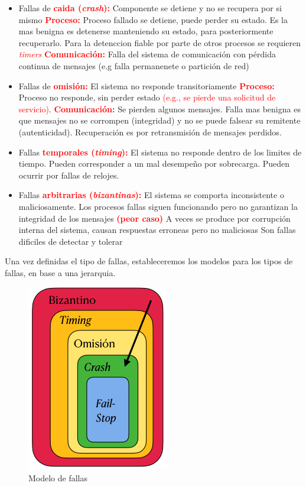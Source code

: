 \begin{itemize}
    \item Fallas de \textcolor{red}{\textbf{caida (\textit{crash}):}} Componente se detiene y no se recupera por si mismo
    \subitem \textcolor{red}{\textbf{Proceso:}} Proceso fallado se detiene, puede perder su estado. Es la mas benigna es detenerse manteniendo su estado, para posteriormente recuperarlo. Para la detenccion fiable por parte de otros procesos se requieren \textcolor{red}{\textit{timers}}
    \subitem \textcolor{red}{\textbf{Comunicación:}} Falla del sistema de comunicación con pérdida continua de mensajes (e.g falla permanenete o partición de red)

    \item Fallas de \textcolor{red}{\textbf{omisión:}} El sistema no responde transitoriamente
    \subitem \textcolor{red}{\textbf{Proceso:}} Proceso no responde, sin perder estado \textcolor{red}{(e.g., se pierde una solicitud de servicio)}.
    \subitem \textcolor{red}{\textbf{Comunicación:}} Se pierden algunos mensajes. Falla mas benigna es que mensajes no se corrompen (integridad) y no se puede falsear su
    remitente (autenticidad). Recuperación es por retransmisión de mensajes perdidos.

    \item Fallas \textcolor{red}{\textbf{temporales (\textit{timing}):}} El sistema no responde dentro de los limites de tiempo.
    \subitem Pueden corresponder a un mal desempeño por sobrecarga. 
    \subitem Pueden ocurrir por fallas de relojes.

    \item Fallas \textcolor{red}{\textbf{arbitrarias (\textit{bizantinas}):}} El sistema se comporta inconsistente o maliciosamente.
    \subitem Los procesos fallas siguen funcionando pero no garantizan la integridad de los mensajes \textcolor{red}{\textbf{(peor caso)}}
    \subitem A veces se produce por corrupción interna del sistema, causan respuestas erroneas pero no maliciosas
    \subitem Son fallas dificiles de detectar y tolerar
\end{itemize}

Una vez definidas el tipo de fallas, estableceremos los modelos para los tipos de fallas, en base a una jerarquia.
\begin{figure}[H]
    \centering
    \includegraphics[width=0.3\linewidth]{img/modelo_de_fallas.png}
    \caption{Modelo de fallas}\label{fig:1761584179354}
\end{figure}

